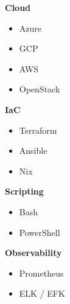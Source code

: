 \documentclass[a4paper,9pt]{extarticle}
\begin{document}
\noindent
\begin{minipage}[t]{0.24\textwidth}
	\textbf{Cloud}
	\begin{itemize}[label=\textbullet, leftmargin=10pt, topsep=1pt, itemsep=1pt]
		\item Azure
		\item GCP
		\item AWS
		\item OpenStack
	\end{itemize}
\end{minipage}\hfill
\begin{minipage}[t]{0.24\textwidth}
	\textbf{IaC}
	\begin{itemize}[label=\textbullet, leftmargin=10pt, topsep=1pt, itemsep=1pt]
		\item Terraform
		\item Ansible
		\item Nix
	\end{itemize}
\end{minipage}\hfill
\begin{minipage}[t]{0.24\textwidth}
	\textbf{Scripting}
	\begin{itemize}[label=\textbullet, leftmargin=10pt, topsep=1pt, itemsep=1pt]
		\item Bash
		\item PowerShell
	\end{itemize}
\end{minipage}\hfill
\begin{minipage}[t]{0.24\textwidth}
	\textbf{Observability}
	\begin{itemize}[label=\textbullet, leftmargin=10pt, topsep=1pt, itemsep=1pt]
		\item Prometheus
		\item ELK / EFK
	\end{itemize}
\end{minipage}

\vspace{5pt}
\end{document}
